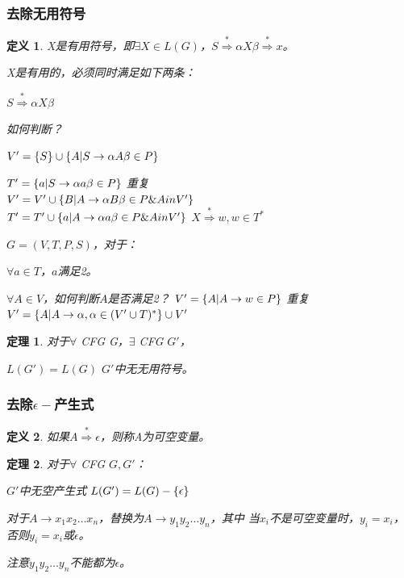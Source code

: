 \documentclass{ctexart}
\newtheorem{definition}{定义}[section]
\newtheorem{theorem}{定理}[section]
\DeclarePairedDelimiter{\set}{\{}{\}}
\begin{document}
\subsubsection{去除无用符号}
\begin{definition}
    X是有用符号，即$\exists X \in L(G)$，$S \overset{*} \Rightarrow
    \alpha X \beta \overset{*} \Rightarrow x$。

    X是有用的，必须同时满足如下两条：
    \begin{outline}[enumerate]
        \1 $S \overset{*} \Rightarrow \alpha X \beta$
            
            如何判断？

            \2 $V' = \set{S} \cup \set{A | S \to \alpha A \beta \in P}$

                $T' = \set{a | S \to \alpha a \beta \in P}$
            \2 重复 \\
            $V' = V' \cup \set{B | A \to \alpha B \beta \in P \& A in V'}$ \\
            $T' = T' \cup \set{a | A \to \alpha a \beta \in P \& A in V'}$
        \1 $X \overset{*} \Rightarrow w, w \in T^*$
        
            $G = (V, T, P, S)$，对于：

            $\forall a \in T$，$a$满足2。
        
            $\forall A \in V$，如何判断$A$是否满足2？
                \2 $V' = \set{A | A \to w \in P}$
                \2 重复 $V' = \set{A | A \to \alpha, \alpha \in (V' \cup T)^*} \cup V'$
    \end{outline}
\end{definition}
\begin{theorem}
    对于$\forall$ CFG G，$\exists$ CFG $G'$，
    \begin{outline}[enumerate]
        \1 $L(G') = L(G)$
        \1 $G'$中无无用符号。
    \end{outline}
\end{theorem}


\subsubsection{去除$\epsilon-$产生式}
\begin{definition}
    如果$A \overset{*} \Rightarrow \epsilon$，则称A为可空变量。
\end{definition}
\begin{theorem}
    对于$\forall$ CFG $G, G'$：
    \begin{outline}[enumerate]
        \1 $G'$中无空产生式
        \1 $L(G') = L(G) - \set{\epsilon}$
    \end{outline}
    对于$A \to x_1x_2\dots x_n$，替换为$A \to y_1y_2\dots y_n$，其中
    当$x_i$不是可空变量时，$y_i = x_i$，否则$y_i = x_i$或$\epsilon$。

    注意$y_1y_2\dots y_n$不能都为$\epsilon$。
\end{theorem}
\end{document}
